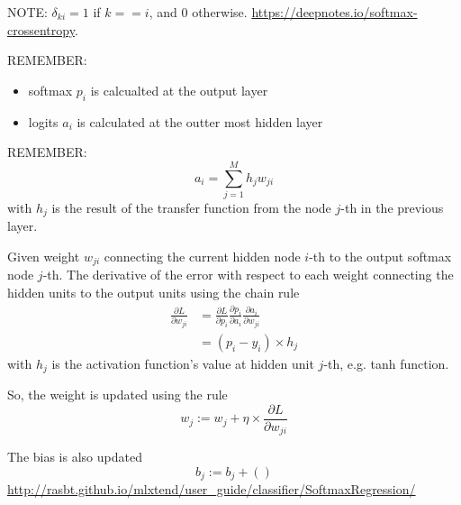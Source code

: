 NOTE: $\delta_{ki} = 1$ if $k==i$, and 0 otherwise. 
\url{https://deepnotes.io/softmax-crossentropy}.

%  
% 
% 
% 

REMEMBER:
\begin{itemize}
  \item softmax $p_i$ is calcualted at the output layer
  
  \item logits $a_i$ is calculated at the outter most hidden layer
\end{itemize}

REMEMBER:
\begin{equation}
a_i = \sum_{j=1}^M h_j w_{ji}
\end{equation}
with $h_j$ is the result of the transfer function from the node $j$-th in the previous layer.

Given weight $w_{ji}$ connecting the current hidden node $i$-th to the output softmax node $j$-th.
The derivative of the error with respect to each weight connecting the hidden units
to the output units using the chain rule
\begin{equation}
\begin{split}
\frac{\partial L}{\partial w_{ji}} &= \frac{\partial L}{\partial p_i} \frac{\partial p_i}{\partial a_i} \frac{\partial a_i}{\partial w_{ji}} \\
 &= (p_i - y_i) \times h_j
\end{split}
\end{equation}
with $h_j$ is the activation function's value at hidden unit $j$-th, e.g. tanh function. 

So, the weight is updated using the rule
\begin{equation}
w_j := w_j + \eta \times \frac{\partial L}{\partial w_{ji}}
\end{equation}

The bias is also updated
\begin{equation}
b_j := b_j + ()
\end{equation}
\url{http://rasbt.github.io/mlxtend/user_guide/classifier/SoftmaxRegression/}

